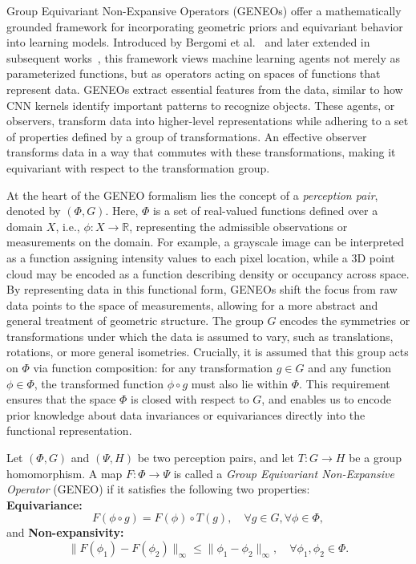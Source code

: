 Group Equivariant Non-Expansive Operators (GENEOs) offer a mathematically
grounded framework for incorporating geometric priors and equivariant behavior
into learning models. Introduced by Bergomi et al.~\cite{bergomi2019towards}
and later extended in subsequent
works~\cite{cascarano2021geometric,conti2022construction}, this framework views
machine learning agents not merely as parameterized functions, but as operators
acting on spaces of functions that represent data.
%
GENEOs extract essential features from the data, similar to how CNN kernels
identify important patterns to recognize objects. These agents, or observers,
transform data into higher-level representations while adhering to a set of
properties defined by a group of transformations. An effective observer
transforms data in a way that commutes with these transformations, making it
equivariant with respect to the transformation group.

At the heart of the GENEO formalism lies the concept of a \emph{perception
    pair}, denoted by $(\Phi, G)$. Here, $\Phi$ is a set of real-valued functions
defined over a domain $X$, i.e., $\phi: X \rightarrow \mathbb{R}$, representing
the admissible observations or measurements on the domain.
%
For example, a grayscale image can be interpreted as a function assigning
intensity values to each pixel location, while a 3D point cloud may be encoded
as a function describing density or occupancy across space.
%
By representing data in this functional form, GENEOs shift the focus from raw
data points to the space of measurements, allowing for a more abstract and
general treatment of geometric structure.
%
The group $G$ encodes the symmetries or transformations under which the data is
assumed to vary, such as translations, rotations, or more general isometries.
Crucially, it is assumed that this group acts on $\Phi$ via function
composition: for any transformation $g \in G$ and any function $\phi \in \Phi$,
the transformed function $\phi \circ g$ must also lie within $\Phi$. This
requirement ensures that the space $\Phi$ is closed with respect to $G$,
and enables us to encode prior knowledge about data invariances or
equivariances directly into the functional representation.

\begin{definition}
    Let $(\Phi, G)$ and $(\Psi, H)$ be two perception pairs,
    and let $T: G \rightarrow H$ be a group homomorphism.
    A map $F: \Phi \rightarrow \Psi$ is called a
    \emph{Group Equivariant Non-Expansive Operator} (GENEO)
    if it satisfies the following two properties:\\
    \textbf{Equivariance:}
    \begin{equation}
        F(\phi \circ g) = F(\phi) \circ T(g), \quad \forall g \in G, \forall \phi \in \Phi,
    \end{equation}
    and \textbf{Non-expansivity:}
    \begin{equation}
        \|F(\phi_1) - F(\phi_2)\|_\infty \leq \|\phi_1 - \phi_2\|_\infty, \quad \forall \phi_1, \phi_2 \in \Phi.
    \end{equation}

\end{definition}

